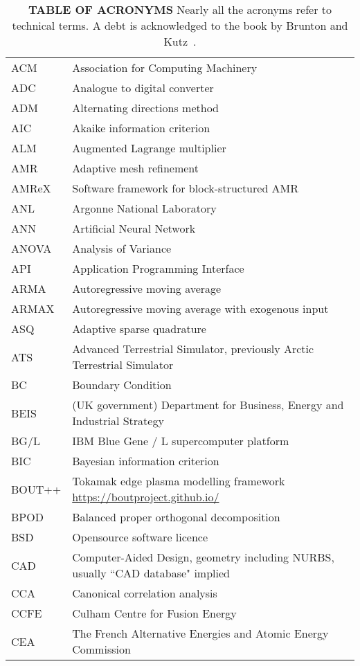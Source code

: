 \begin{longtable}{|p{4.0cm}|p{12.0cm}|}
\caption{\textbf{\textsf{TABLE OF ACRONYMS}} Nearly all the acronyms refer to technical
terms. A debt is acknowledged to the book by Brunton and Kutz~\cite{bruntonkutz}.
} \\
\hline
ACM & Association for Computing Machinery\\
ADC & Analogue to digital converter\\
ADM  & Alternating directions method \\
AIC  & Akaike information criterion \\
ALM  & Augmented Lagrange multiplier \\
AMR & Adaptive mesh refinement\\
AMReX & Software framework for block-structured AMR\\
ANL & Argonne National Laboratory \\
ANN & Artificial Neural Network \\
ANOVA & Analysis of Variance \\
API & Application Programming Interface \\
ARMA  & Autoregressive moving average \\
ARMAX  & Autoregressive moving average with exogenous input \\
ASQ & Adaptive sparse quadrature \\
ATS & Advanced Terrestrial Simulator, previously Arctic Terrestrial Simulator \\
BC & Boundary Condition\\
BEIS &  (UK government) Department for Business, Energy and Industrial Strategy \\
BG/L & IBM Blue Gene / L supercomputer platform\\
BIC  & Bayesian information criterion \\
BOUT++ & Tokamak edge plasma modelling framework \url{https://boutproject.github.io/} \\
BPOD  & Balanced proper orthogonal decomposition \\
BSD  & Opensource software licence \\
CAD & Computer-Aided Design, geometry including NURBS, usually ``CAD database" implied \\
CCA  & Canonical correlation analysis \\
CCFE & Culham Centre for Fusion Energy \\
CEA  & The French Alternative Energies and Atomic Energy Commission \\

\end{longtable}
